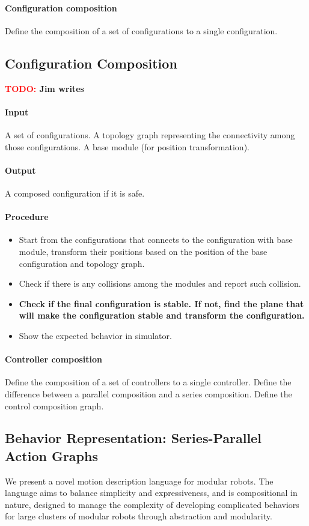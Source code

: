 \documentclass[conference]{IEEEtran}
\theoremstyle{definition}
\newcommand{\TODO}[1]{ {\bf \textcolor{red}{TODO:} #1 }}
\begin{document}
\paragraph{Configuration composition}
Define the composition of a set of configurations to a single configuration.

\subsection{Configuration Composition}
\TODO{Jim writes}
\paragraph{Input}
A set of configurations. A topology graph representing the connectivity among those configurations. A base module (for position transformation).
\paragraph{Output}
A composed configuration if it is safe.
\paragraph{Procedure}
\begin{itemize}
\item Start from the configurations that connects to the configuration with base module, transform their positions based on the position of the base configuration and topology graph.
\item Check if there is any collisions among the modules and report such collision.
\item \textbf{Check if the final configuration is stable. If not, find the plane that will make the configuration stable and transform the configuration.}
\item Show the expected behavior in simulator.
\end{itemize}

\paragraph{Controller composition}
Define the composition of a set of controllers to a single controller. Define the difference between a parallel composition and a series composition. Define the control composition graph.

\subsection{Behavior Representation: Series-Parallel Action Graphs}
\label{sec:behavior-representation}
We present a novel motion description language for modular robots.  The
language aims to balance simplicity and expressiveness, and is compositional in
nature, designed to manage the complexity of developing complicated behaviors
for large clusters of modular robots through abstraction and modularity.
\end{document}
